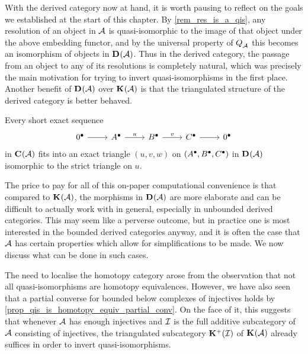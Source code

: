 With the derived category now at hand, it is worth pausing to reflect
on the goals we established at the start of this chapter.
By \cref{rem_res_is_a_qis}, any resolution of an object in
$\abcat{A}$ is quasi-isomorphic to the image of that object under the
above embedding functor, and by the universal property of
$\dercatlocln{\abcat{A}}$ this becomes an isomorphism of objects in
$\dercat{\abcat{A}}$.
Thus in the derived category, the passage from an object to any of
its resolutions is completely natural, which was precisely the main
motivation for trying to invert quasi-isomorphisms in the first place.
Another benefit of $\dercat{\abcat{A}}$ over $\homcat{\abcat{A}}$ is
that the triangulated structure of the derived category is better behaved.

\begin{proposition}
  \label{prop_dercat_ses_exact_triang}
  Every short exact sequence
  \[
    \begin{tikzcd}
      \cochaincomp{0} \arrow[r]
      & \cochaincomp{A} \arrow[r, "u"]
      & \cochaincomp{B} \arrow[r, "v"]
      & \cochaincomp{C} \arrow[r]
      & \cochaincomp{0}
    \end{tikzcd}
  \]
  in $\Ch{\abcat{A}}$ fits into an exact triangle $(u, v, w)$ on
  $(\cochaincomp{A}, \cochaincomp{B}, \cochaincomp{C})$ in
  $\dercat{\abcat{A}}$ isomorphic to the strict triangle on $u$.
\end{proposition}

The price to pay for all of this on-paper computational convenience
is that compared to $\homcat{\abcat{A}}$, the morphisms in
$\dercat{\abcat{A}}$ are more elaborate and can be difficult to
actually work with in general, especially in unbounded derived categories.
This may seem like a perverse outcome, but in practice one is most
interested in the bounded derived categories anyway, and it is often
the case that $\abcat{A}$ has certain properties which allow for
simplifications to be made.
We now discuss what can be done in such cases.

The need to localise the homotopy category arose from the observation
that not all quasi-isomorphisms are homotopy equivalences.
However, we have also seen that a partial converse for bounded below
complexes of injectives holds by \cref{prop_qis_is_homotopy_equiv_partial_conv}.
On the face of it, this suggests that whenever $\abcat{A}$ has enough
injectives and $\abcat{I}$ is the full additive subcategory of
$\abcat{A}$ consisting of injectives, the triangulated subcategory
$\homcat[+]{\abcat{I}}$ of $\homcat{\abcat{A}}$ already suffices in
order to invert quasi-isomorphisms.

